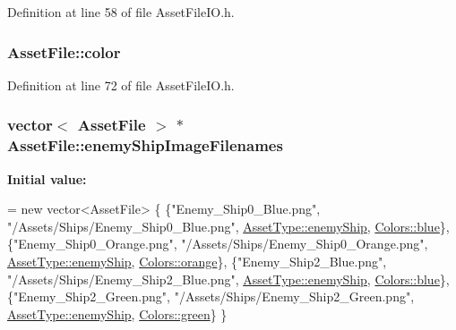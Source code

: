 Definition at line 58 of file Asset\-File\-I\-O.\-h.

\hypertarget{struct_asset_file_a9665f3c7769b8cee2106d718de7c297c}{
\subsubsection[{color}]{ Asset\-File\-::color}}\label{struct_asset_file_a9665f3c7769b8cee2106d718de7c297c}


Definition at line 72 of file Asset\-File\-I\-O.\-h.

\hypertarget{struct_asset_file_a792cd746ec7903ca9d34a094627bc947}{
\subsubsection[{enemy\-Ship\-Image\-Filenames}]{\setlength{\rightskip}{0pt plus 5cm}vector$<$ {\bf Asset\-File} $>$ $\ast$ Asset\-File\-::enemy\-Ship\-Image\-Filenames\hspace{0.3cm}{\ttfamily [static]}}}\label{struct_asset_file_a792cd746ec7903ca9d34a094627bc947}
{\bfseries Initial value\-:}
\begin{DoxyCode}
= \textcolor{keyword}{new} vector<AssetFile> \{
    \{\textcolor{stringliteral}{"Enemy\_Ship0\_Blue.png"},   \textcolor{stringliteral}{"/Assets/Ships/Enemy\_Ship0\_Blue.png"},    
      \hyperlink{_asset_file_i_o_8h_a72d924d1cb8e1544b6d5198e98d52ca9a7a484b4c7c5ba2d013a34d7b28636ade}{AssetType::enemyShip}, \hyperlink{_character_data_8h_a55ecd4f2ec2ebfe8d5b0163e4ac2a967a48d6215903dff56238e52e8891380c8f}{Colors::blue}\},
    \{\textcolor{stringliteral}{"Enemy\_Ship0\_Orange.png"}, \textcolor{stringliteral}{"/Assets/Ships/Enemy\_Ship0\_Orange.png"},  
      \hyperlink{_asset_file_i_o_8h_a72d924d1cb8e1544b6d5198e98d52ca9a7a484b4c7c5ba2d013a34d7b28636ade}{AssetType::enemyShip}, \hyperlink{_character_data_8h_a55ecd4f2ec2ebfe8d5b0163e4ac2a967afe01d67a002dfa0f3ac084298142eccd}{Colors::orange}\},
    \{\textcolor{stringliteral}{"Enemy\_Ship2\_Blue.png"},   \textcolor{stringliteral}{"/Assets/Ships/Enemy\_Ship2\_Blue.png"},    
      \hyperlink{_asset_file_i_o_8h_a72d924d1cb8e1544b6d5198e98d52ca9a7a484b4c7c5ba2d013a34d7b28636ade}{AssetType::enemyShip}, \hyperlink{_character_data_8h_a55ecd4f2ec2ebfe8d5b0163e4ac2a967a48d6215903dff56238e52e8891380c8f}{Colors::blue}\},
    \{\textcolor{stringliteral}{"Enemy\_Ship2\_Green.png"},  \textcolor{stringliteral}{"/Assets/Ships/Enemy\_Ship2\_Green.png"},   
      \hyperlink{_asset_file_i_o_8h_a72d924d1cb8e1544b6d5198e98d52ca9a7a484b4c7c5ba2d013a34d7b28636ade}{AssetType::enemyShip}, \hyperlink{_character_data_8h_a55ecd4f2ec2ebfe8d5b0163e4ac2a967a9f27410725ab8cc8854a2769c7a516b8}{Colors::green}\}
\}
\end{DoxyCode}


